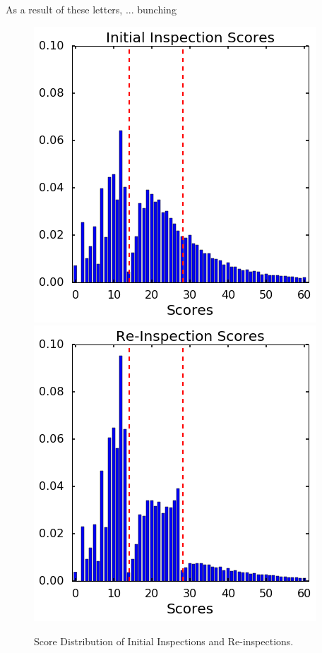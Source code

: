 \documentclass[10pt]{article} %
\begin{document}
As a result of these letters, ... bunching
\begin{figure}[htbp]
\centering
\includegraphics[scale = 0.45]{Figures/init_score.png}
\includegraphics[scale = 0.45]{Figures/re_score.png}
\caption{Score Distribution of Initial Inspections and Re-inspections.}
\label{bunching}
\end{figure}
\end{document}
